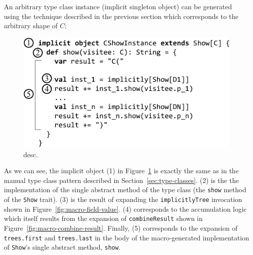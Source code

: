 \documentclass[preprint]{sigplanconf}
\begin{document}
An arbitrary type class instance (implicit singleton object) can be generated
using the technique described in the previous section which corresponds to the
arbitrary shape of $C$:

\begin{figure}[h!]
\centering
\includegraphics[width=0.87\columnwidth]{basic-generation.pdf}
\caption{desc.}
\label{fig:basic-generation}
\end{figure}

As we can see, the implicit object (1) in Figure~\ref{fig:basic-generation} is
exactly the same as in the manual type class pattern described in
Section~\ref{sec:type-classes}. (2) is the the implementation of the single
abstract method of the type class (the \verb|show| method of the \verb|Show|
trait). (3) is the result of expanding the \verb|implicitlyTree| invocation
shown in Figure~\ref{fig:macro-field-value}. (4) corresponds to the
accumulation logic which itself results from the expansion of
\verb|combineResult| shown in Figure~\ref{fig:macro-combine-result}. Finally,
(5) corresponds to the expansion of \verb|trees.first| and \verb|trees.last|
in the body of the macro-generated implementation of \verb|Show|'s single
abstract method, \verb|show|.






\end{document}
